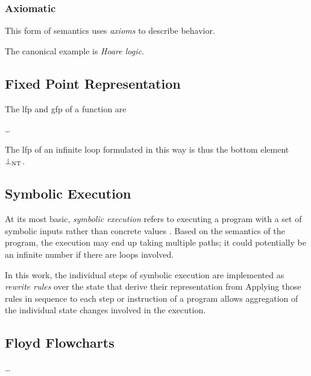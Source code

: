 \subsubsection{Axiomatic}
This form of semantics uses \emph{axioms} to describe behavior.

The canonical example is \emph{Hoare logic}.%

\subsection{Fixed Point Representation}
The \ac{lfp} and \ac{gfp} of a function are

\todo\dots

The \ac{lfp} of an infinite loop formulated in this way
is thus the bottom element $\bot_\mathrm{NT}$.%

\subsection{Symbolic Execution}
At its most basic, \emph{symbolic execution} refers to
executing a program with a set of symbolic inputs
rather than concrete values \autocite{king1976symbolic}.
Based on the semantics of the program, the execution may end up taking multiple paths;
it could potentially be an infinite number if there are loops involved.


In this work, the individual steps of symbolic execution
are implemented as \emph{rewrite rules} over the state%
that derive their representation from 
Applying those rules in sequence to each step or instruction of a program
allows aggregation of the individual state changes involved in the execution.

\subsection{Floyd Flowcharts}\label{se:floyd}
\todo\dots


